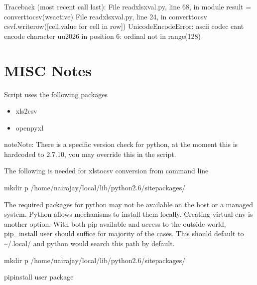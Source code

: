 \documentclass[letterpaper,10pt,english]{sphinxmanual}
\begin{document}
%
\begin{sphinxVerbatim}[commandchars=\\\{\}]
Traceback (most recent call last):
  File \PYGZdq{}read\PYGZus{}xlsx\PYGZus{}val.py\PYGZdq{}, line 68, in \PYGZlt{}module\PYGZgt{}
    result = convert\PYGZus{}to\PYGZus{}csv(ws\PYGZus{}active)
  File \PYGZdq{}read\PYGZus{}xlsx\PYGZus{}val.py\PYGZdq{}, line 24, in convert\PYGZus{}to\PYGZus{}csv
    csv\PYGZus{}f.writerow([cell.value for cell in row])
UnicodeEncodeError: \PYGZsq{}ascii\PYGZsq{} codec can\PYGZsq{}t encode character u\PYGZsq{}\PYGZbs{}u2026\PYGZsq{} in position 6: ordinal not in range(128)
\end{sphinxVerbatim}


\section{MISC Notes}
\label{\detokenize{intro:misc-notes}}
Script uses the following packages
\begin{itemize}
\item {} 
xls2csv

\item {} 
openpyxl

\end{itemize}

\begin{sphinxadmonition}{note}{Note:}
There is a specific version check for python, at the moment this is hardcoded
to 2.7.10, you may override this in the script.
\end{sphinxadmonition}

The following is needed for xlstocsv conversion from command line

%
\begin{sphinxVerbatim}[commandchars=\\\{\}]
mkdir \PYGZhy{}p /home/nairajay/local/lib/python2.6/site\PYGZhy{}packages/
\end{sphinxVerbatim}

The required packages for python may not be available on the host or a
managed system. Python allows mechanisms to install them locally. Creating
virtual env is another option.
With both pip available and access to the outside world, pip\_install \textendash{}user should
suffice for majority of the cases. This should default to \textasciitilde{}/.local/ and
python would search this path by default.

%
\begin{sphinxVerbatim}[commandchars=\\\{\}]
mkdir \PYGZhy{}p /home/nairajay/local/lib/python2.6/site\PYGZhy{}packages/

pip\PYGZus{}install \PYGZhy{}\PYGZhy{}user \PYGZlt{}package\PYGZgt{}
\end{sphinxVerbatim}
\end{document}
